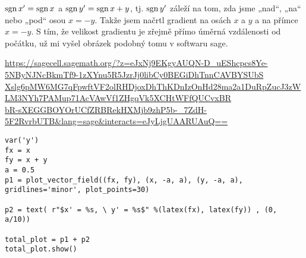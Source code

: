 \documentclass[12pt]{article}					%
\begin{document}
\begin{priklad}
	\begin{reseni}[4.]
		$\operatorname{sgn} x' = \operatorname{sgn} x$ a $\operatorname{sgn} y' = \operatorname{sgn} x + y$, tj. $\operatorname{sgn} y'$ záleží na tom, zda jsme „nad“, „na“ nebo „pod“ osou $x = -y$. Takže jsem načrtl gradient na osách $x$ a $y$ a na přímce $x = -y$. S tím, že velikost gradientu je zřejmě přímo úměrná vzdálenosti od počátku, už mi vyšel obrázek podobný tomu v softwaru sage.
	\end{reseni}

	\begin{reseni}[5.]
		\tiny
		\href{https://sagecell.sagemath.org/?z=eJxNj9EKgyAUQN-D_uEShcpcs8Ye-5NByNJNcBkmTf9-1zXYnu5R5JzrJj0libCy0BEGiDhTnnCAVBYSUbSXslg6pMW6MG7qFpwftVF2olRHDjoxDhThKDnIzOnHd28ma2a1DuRpZucJ3zWLM3NYh7PAMup71AcVAwVf1ZHgqVk5XCHtWFfQUCvxBRbR-sXEGGBOYOrUCfZRBRekHXMjb9zhP5b-_7ZdH-5F2RvrbUTB&lang=sage&interacts=eJyLjgUAARUAuQ==}{https://sagecell.sagemath.org/?z=eJxNj9EKgyAUQN-D\_uEShcpcs8Ye-5NByNJNcBkmTf9-1zXYnu5R5JzrJj0libCy0BEGiDhTnnCAVBYSUbS}\\
		\href{https://sagecell.sagemath.org/?z=eJxNj9EKgyAUQN-D_uEShcpcs8Ye-5NByNJNcBkmTf9-1zXYnu5R5JzrJj0libCy0BEGiDhTnnCAVBYSUbSXslg6pMW6MG7qFpwftVF2olRHDjoxDhThKDnIzOnHd28ma2a1DuRpZucJ3zWLM3NYh7PAMup71AcVAwVf1ZHgqVk5XCHtWFfQUCvxBRbR-sXEGGBOYOrUCfZRBRekHXMjb9zhP5b-_7ZdH-5F2RvrbUTB&lang=sage&interacts=eJyLjgUAARUAuQ==}{Xslg6pMW6MG7qFpwftVF2olRHDjoxDhThKDnIzOnHd28ma2a1DuRpZucJ3zWLM3NYh7PAMup71AcVAwVf1ZHgqVk5XCHtWFfQUCvxBR}\\
		\href{https://sagecell.sagemath.org/?z=eJxNj9EKgyAUQN-D_uEShcpcs8Ye-5NByNJNcBkmTf9-1zXYnu5R5JzrJj0libCy0BEGiDhTnnCAVBYSUbSXslg6pMW6MG7qFpwftVF2olRHDjoxDhThKDnIzOnHd28ma2a1DuRpZucJ3zWLM3NYh7PAMup71AcVAwVf1ZHgqVk5XCHtWFfQUCvxBRbR-sXEGGBOYOrUCfZRBRekHXMjb9zhP5b-_7ZdH-5F2RvrbUTB&lang=sage&interacts=eJyLjgUAARUAuQ==}{bR-sXEGGBOYOrUCfZRBRekHXMjb9zhP5b-\_7ZdH-5F2RvrbUTB\&lang=sage\&interacts=eJyLjgUAARUAuQ==}
\begin{verbatim}
var('y')
fx = x
fy = x + y
a = 0.5
p1 = plot_vector_field((fx, fy), (x, -a, a), (y, -a, a), gridlines='minor', plot_points=30)

p2 = text( r"$x' = %s, \ y' = %s$" %(latex(fx), latex(fy)) , (0, a/10))

total_plot = p1 + p2
total_plot.show()
\end{verbatim}
	\end{reseni}
\end{priklad}
\end{document}
